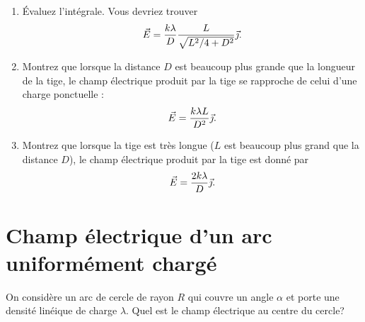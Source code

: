\documentclass{tufte-handout}
\begin{document}
\begin{enumerate}
  \item Évaluez l'intégrale. Vous devriez trouver
    \[
      \vec{E} = \frac{k \lambda}{D} \frac{L}{\sqrt{L^2 / 4 + D^2}} \vec{\jmath}.
    \]

  \item Montrez que lorsque la distance $D$ est beaucoup plus grande que la
    longueur de la tige, le champ électrique produit par la tige se rapproche
    de celui d'une charge ponctuelle :
    \[
      \vec{E} = \frac{k\lambda L}{D^2} \vec{\jmath}.
    \]

  \item Montrez que lorsque la tige est très longue ($L$ est beaucoup plus
    grand que la distance $D$), le champ électrique produit par la tige est
    donné par
    \[
      \vec{E} = \frac{2k\lambda }{D} \vec{\jmath}.
    \]

\end{enumerate}


\section{Champ électrique d'un arc uniformément chargé}

On considère un arc de cercle de rayon $R$ qui couvre un angle $\alpha$ et
porte une densité linéique de charge $\lambda$.  Quel est le champ électrique
au centre du cercle?

\begin{marginfigure}
\end{marginfigure}
\end{document}
